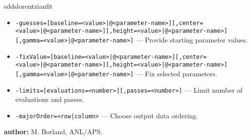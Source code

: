 \begin{sddsprog}{sddslorentzianfit}
\begin{itemize}
      \item \verb!-guesses=[baseline=<value>|@<parameter-name>][,center=<value>|@<parameter-name>][,height=<value>|@<parameter-name>][,gamma=<value>|@<parameter-name>]! --- Provide starting parameter values.
      \item \verb!-fixValue=[baseline=<value>|@<parameter-name>][,center=<value>|@<parameter-name>][,height=<value>|@<parameter-name>][,gamma=<value>|@<parameter-name>]! --- Fix selected parameters.
      \item \verb|-limits=[evaluations=<number>][,passes=<number>]| --- Limit number of evaluations and passes.
      \item \verb!-majorOrder=<row|column>! --- Choose output data ordering.
    \end{itemize}
  \item \textbf{author:} M. Borland, ANL/APS.
\end{sddsprog}
